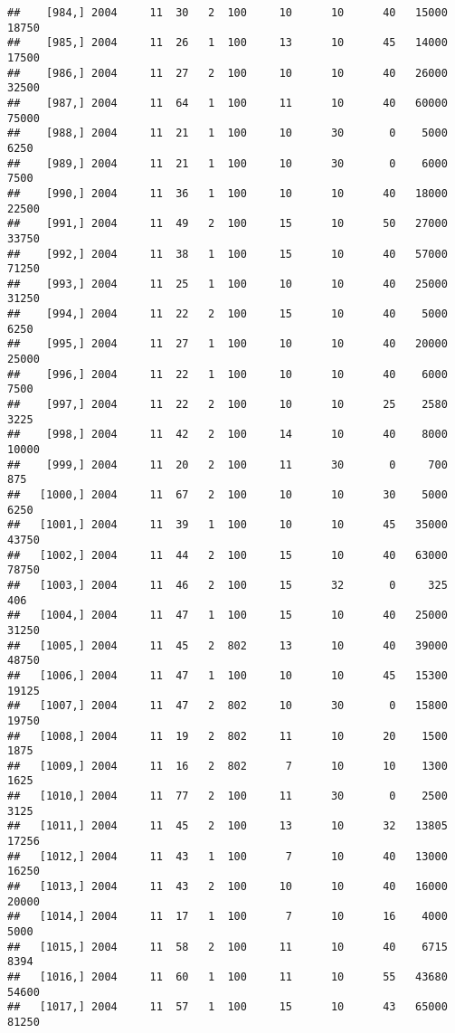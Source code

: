 \documentclass{article}\usepackage[]{graphicx}\usepackage[]{color}
\makeatletter
\newenvironment{kframe}{%
 \def\at@end@of@kframe{}%
 \ifinner\ifhmode%
  \def\at@end@of@kframe{\end{minipage}}%
  \begin{minipage}{\columnwidth}%
 \fi\fi%
 \def\FrameCommand##1{\hskip\@totalleftmargin \hskip-\fboxsep
 \colorbox{shadecolor}{##1}\hskip-\fboxsep
     \hskip-\linewidth \hskip-\@totalleftmargin \hskip\columnwidth}%
 \MakeFramed {\advance\hsize-\width
   \@totalleftmargin\z@ \linewidth\hsize
   \@setminipage}}%
 {\par\unskip\endMakeFramed%
 \at@end@of@kframe}
\newenvironment{knitrout}{}{} %
\makeatother
\begin{document}
\begin{knitrout}
\begin{kframe}
\begin{verbatim}
##    [984,] 2004     11  30   2  100     10      10      40   15000   18750
##    [985,] 2004     11  26   1  100     13      10      45   14000   17500
##    [986,] 2004     11  27   2  100     10      10      40   26000   32500
##    [987,] 2004     11  64   1  100     11      10      40   60000   75000
##    [988,] 2004     11  21   1  100     10      30       0    5000    6250
##    [989,] 2004     11  21   1  100     10      30       0    6000    7500
##    [990,] 2004     11  36   1  100     10      10      40   18000   22500
##    [991,] 2004     11  49   2  100     15      10      50   27000   33750
##    [992,] 2004     11  38   1  100     15      10      40   57000   71250
##    [993,] 2004     11  25   1  100     10      10      40   25000   31250
##    [994,] 2004     11  22   2  100     15      10      40    5000    6250
##    [995,] 2004     11  27   1  100     10      10      40   20000   25000
##    [996,] 2004     11  22   1  100     10      10      40    6000    7500
##    [997,] 2004     11  22   2  100     10      10      25    2580    3225
##    [998,] 2004     11  42   2  100     14      10      40    8000   10000
##    [999,] 2004     11  20   2  100     11      30       0     700     875
##   [1000,] 2004     11  67   2  100     10      10      30    5000    6250
##   [1001,] 2004     11  39   1  100     10      10      45   35000   43750
##   [1002,] 2004     11  44   2  100     15      10      40   63000   78750
##   [1003,] 2004     11  46   2  100     15      32       0     325     406
##   [1004,] 2004     11  47   1  100     15      10      40   25000   31250
##   [1005,] 2004     11  45   2  802     13      10      40   39000   48750
##   [1006,] 2004     11  47   1  100     10      10      45   15300   19125
##   [1007,] 2004     11  47   2  802     10      30       0   15800   19750
##   [1008,] 2004     11  19   2  802     11      10      20    1500    1875
##   [1009,] 2004     11  16   2  802      7      10      10    1300    1625
##   [1010,] 2004     11  77   2  100     11      30       0    2500    3125
##   [1011,] 2004     11  45   2  100     13      10      32   13805   17256
##   [1012,] 2004     11  43   1  100      7      10      40   13000   16250
##   [1013,] 2004     11  43   2  100     10      10      40   16000   20000
##   [1014,] 2004     11  17   1  100      7      10      16    4000    5000
##   [1015,] 2004     11  58   2  100     11      10      40    6715    8394
##   [1016,] 2004     11  60   1  100     11      10      55   43680   54600
##   [1017,] 2004     11  57   1  100     15      10      43   65000   81250

\end{verbatim}
\end{kframe}
\end{knitrout}
\end{document}

